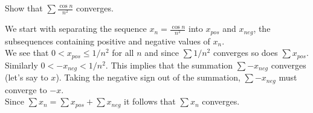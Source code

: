 \documentclass[boxes, qed]{homework}
\begin{document}
\begin{problem}Show that $\sum{\frac{\cos{n}}{n^2}}$ converges.
\end{problem}
\begin{solution}We start with separating the sequence $x_n=\frac{\cos{n}}{n^2}$ 
  into $x_{pos}$ and $x_{neg}$, 
  the subsequences containing positive and negative values of $x_n$.\\
  We see that $0<x_{pos}\le{1/n^2}$ for all $n$ and since $\sum{1/n^2}$ converges
  so does $\sum{x_{pos}}$.\\

  Similarly $0<-x_{neg}<1/n^2$. This implies that the summation
  $\sum{-x_{neg}}$ converges (let's say to $x$). Taking the negative sign out of the
  summation, $\sum{-x_{neg}}$ must converge to $-x$.\\

  Since $\sum{x_n}=\sum{x_{pos}}+\sum{x_{neg}}$ it follows that $\sum{x_n}$
  converges.
\end{solution}
\end{document}
